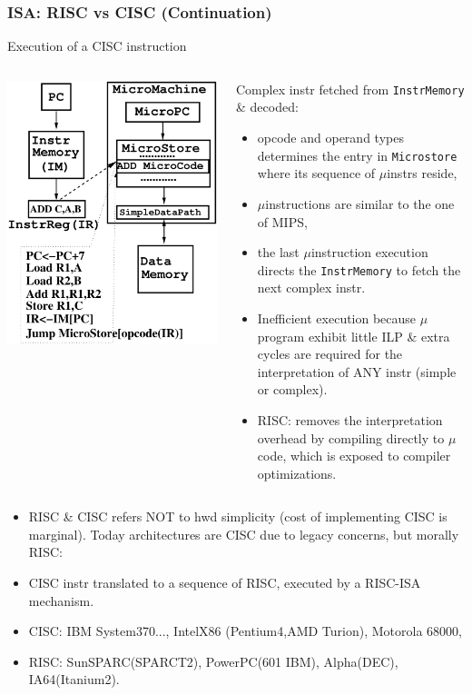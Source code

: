 \documentclass{beamer}
\begin{document}
\begin{frame}[fragile,t]
\frametitle{ISA: RISC vs CISC (Continuation)}

\begin{block}{Execution of a CISC instruction}
\begin{columns}
\includegraphics[width=20ex]{Figures/CISCarch}
\begin{scriptsize}
Complex instr fetched from {\tt InstrMemory} \& decoded:
\begin{itemize}
    \item opcode and operand types determines the entry in {\tt Microstore}
            where its sequence of $\mu$instrs reside,
    \item $\mu$instructions are similar to the one of MIPS,
    \item the last $\mu$instruction execution directs the {\tt InstrMemory}
            to fetch the next complex instr. 
    \item Inefficient execution because $\mu$program exhibit little ILP \&
            extra cycles are required for the interpretation of ANY
            instr (simple or complex).   
    \item RISC: removes the interpretation overhead by compiling directly to 
            $\mu$code, which is exposed to compiler optimizations.
\end  {itemize}  
\end{scriptsize}
\end{columns}
\end{block}

\begin{scriptsize}
\begin{itemize}
\item RISC \& CISC refers NOT to hwd simplicity (cost of implementing CISC is marginal).
      Today architectures are CISC due to legacy concerns, but morally RISC:
\item CISC instr translated to a sequence of RISC, executed by
            a RISC-ISA mechanism.
\item CISC: IBM System370..., IntelX86 (Pentium4,AMD Turion), Motorola 68000,
\item RISC: SunSPARC(SPARCT2), PowerPC(601 IBM), Alpha(DEC), IA64(Itanium2).  
\end  {itemize}
\end{scriptsize}
\end{frame}
\end{document}
